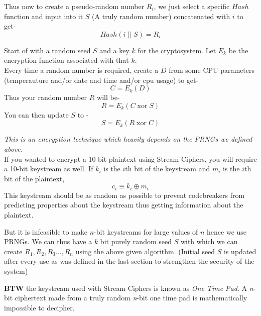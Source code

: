 			Thus now to create a pseudo-random number \(R_i\), we just select a specific \(Hash\) function and input into it \(S\) (A truly random number) concatenated with \(i\) to get-\[Hash(i\;||\;S)=R_i\] 

		Start of with a random seed \(S\) and a key \(k\) for the cryptosystem. Let \(E_k\) be the encryption function associated with that \(k\). \\
		Every time a random number is required, create a \(D\) from some CPU parameters (temperauture and/or date and time and/or cpu usage) to get- \[C=E_k(D)\]
		Thus your random number \(R\) will be- \[R=E_k(C\; \text{xor}\; S)\]
		You can then update \(S\) to - \[S=E_k(R \;\text{xor}\; C)\]

		\emph{This is an encryption technique which heavily depends on the PRNGs we defined above.}\\
		If you wanted to encrypt a 10-bit plaintext using Stream Ciphers, you will require a 10-bit keystream as well. If \(k_i\) is the \(i\)th bit of the keystream and \(m_i\) is the \(i\)th bit of the plaintext, \[c_i \equiv k_i \oplus m_i\] This keystream should be as random as possible to prevent codebreakers from predicting properties about the keystream thus getting information about the plaintext. \par
		But it is infeasible to make \(n\)-bit keystreams for large values of \(n\) hence we use PRNGs. We can thus have a \(k\) bit purely random seed \(S\) with which we can create \(R_1, R_2, R_3 \ldots, R_n\) using the above given algorithm. (Initial seed \(S\) is updated after every use as was defined in the last section to strengthen the security of the system)\par
		
		\begin{tcolorbox}\label{box:onetimepad}
			\textbf{BTW} the keystream used with Stream Ciphers is known as \emph{One Time Pad}. A \emph{n}-bit ciphertext made from a truly random \emph{n}-bit one time pad is mathematically impossible to decipher.
		\end{tcolorbox}
		
